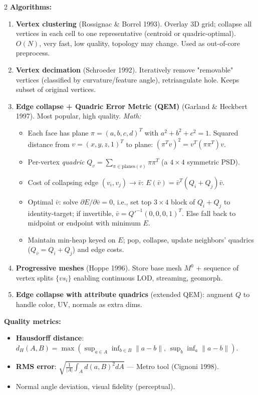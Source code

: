 \begin{paracol}{2}
\textbf{Algorithms:}
\begin{enumerate}[leftmargin=*,nosep]
  \item \textbf{Vertex clustering} (Rossignac \& Borrel 1993). Overlay 3D grid; collapse all vertices in each cell to one representative (centroid or quadric-optimal). $O(N)$, very fast, low quality, topology may change. Used as out-of-core preprocess.
  \item \textbf{Vertex decimation} (Schroeder 1992). Iteratively remove "removable" vertices (classified by curvature/feature angle), retriangulate hole. Keeps subset of original vertices.
  \item \textbf{Edge collapse + Quadric Error Metric (QEM)} (Garland \& Heckbert 1997). Most popular, high quality. \emph{Math:}
    \begin{itemize}[leftmargin=1.2em,nosep]
      \item Each face has plane $\pi=(a,b,c,d)^T$ with $a^2+b^2+c^2=1$. Squared distance from $v=(x,y,z,1)^T$ to plane: $(\pi^T v)^2 = v^T(\pi\pi^T)v$.
      \item Per-vertex \emph{quadric} $Q_v = \sum_{\pi\in\text{planes}(v)} \pi\pi^T$ (a $4{\times}4$ symmetric PSD).
      \item Cost of collapsing edge $(v_i,v_j)\to\bar v$: $E(\bar v)=\bar v^T(Q_i+Q_j)\bar v$.
      \item Optimal $\bar v$: solve $\partial E/\partial \bar v=0$, i.e., set top $3\times4$ block of $Q_i+Q_j$ to identity-target; if invertible, $\bar v=Q'^{-1}(0,0,0,1)^T$. Else fall back to midpoint or endpoint with minimum $E$.
      \item Maintain min-heap keyed on $E$; pop, collapse, update neighbors' quadrics ($Q_{\bar v}=Q_i+Q_j$) and edge costs.
    \end{itemize}
  \item \textbf{Progressive meshes} (Hoppe 1996). Store base mesh $M^0$ + sequence of vertex splits $\{vs_i\}$ enabling continuous LOD, streaming, geomorph.
  \item \textbf{Edge collapse with attribute quadrics} (extended QEM): augment $Q$ to handle color, UV, normals as extra dims.
\end{enumerate}

\textbf{Quality metrics:}
\begin{itemize}[leftmargin=*,nosep]
  \item \textbf{Hausdorff distance}: $d_H(A,B)=\max(\sup_{a\in A}\inf_{b\in B}\|a-b\|,\,\sup_b\inf_a\|a-b\|)$.
  \item \textbf{RMS error}: $\sqrt{\tfrac{1}{|A|}\int_A d(a,B)^2 dA}$ — Metro tool (Cignoni 1998).
  \item Normal angle deviation, visual fidelity (perceptual).
\end{itemize}


\end{paracol}
